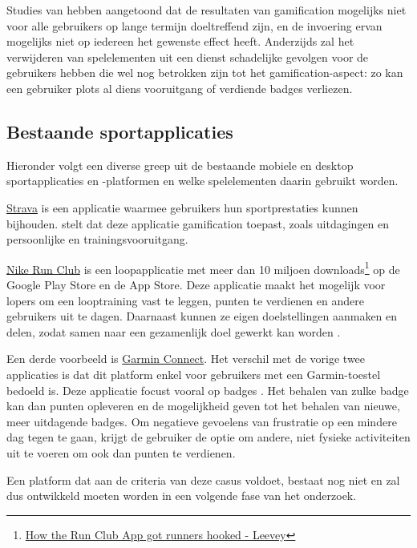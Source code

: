 Studies van \textcite{Hamari2013a} hebben aangetoond dat de resultaten van gamification mogelijks niet voor alle gebruikers op lange termijn doeltreffend zijn, en de invoering ervan mogelijks niet op iedereen het gewenste effect heeft.
Anderzijds zal het verwijderen van spelelementen uit een dienst schadelijke gevolgen voor de gebruikers hebben die wel nog betrokken zijn tot het gamification-aspect: zo kan een gebruiker plots al diens vooruitgang of verdiende badges verliezen.

\subsection{Bestaande sportapplicaties}

Hieronder volgt een diverse greep uit de bestaande mobiele en desktop sportapplicaties en -platformen en welke spelelementen daarin gebruikt worden.

\href{https://www.strava.com/}{Strava} is een applicatie waarmee gebruikers hun sportprestaties kunnen bijhouden. \textcite{Barratt2017} stelt dat deze applicatie gamification toepast, zoals uitdagingen en persoonlijke en trainingsvooruitgang.

\href{https://www.nike.com/be/en/nrc-app}{Nike Run Club} is een loopapplicatie met meer dan 10 miljoen downloads\footnote{\href{https://bootcamp.uxdesign.cc/how-the-nike-run-club-app-got-runners-hooked-2850c7654fc5}{How the Run Club App got runners hooked - Leevey}} op de Google Play Store en de App Store. Deze applicatie maakt het mogelijk voor lopers om een looptraining vast te leggen, punten te verdienen en andere gebruikers uit te dagen. Daarnaast kunnen ze eigen doelstellingen aanmaken en delen, zodat samen naar een gezamenlijk doel gewerkt kan worden \autocite{StaalnackeLarsson2013}.

Een derde voorbeeld is \href{https://connect.garmin.com/}{Garmin Connect}. Het verschil met de vorige twee applicaties is dat dit platform enkel voor gebruikers met een Garmin-toestel bedoeld is. Deze applicatie focust vooral op badges \autocite{Ilhan2019}. Het behalen van zulke badge kan dan punten opleveren en de mogelijkheid geven tot het behalen van nieuwe, meer uitdagende badges. Om negatieve gevoelens van frustratie op een mindere dag tegen te gaan, krijgt de gebruiker de optie om andere, niet fysieke activiteiten uit te voeren om ook dan punten te verdienen.

Een platform dat aan de criteria van deze casus voldoet, bestaat nog niet en zal dus ontwikkeld moeten worden in een volgende fase van het onderzoek.


